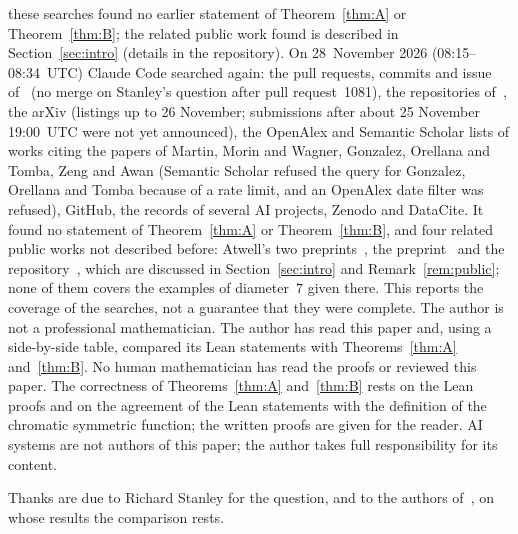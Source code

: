 \documentclass[11pt]{article}
\theoremstyle{definition}
\theoremstyle{remark}
\begin{document}
these searches found no earlier statement of Theorem~\ref{thm:A} or
Theorem~\ref{thm:B}; the related public work found is described in
Section~\ref{sec:intro} (details in the repository).
On 28~November 2026 (08:15--08:34~UTC) Claude Code searched again: the pull
requests, commits and issue of~\cite{sc} (no merge on Stanley's question after
pull request~1081), the repositories of~\cite{aur}, the arXiv (listings up to
26 November; submissions after about 25 November 19:00~UTC were not yet
announced), the OpenAlex and Semantic Scholar lists of works citing the papers of
Martin, Morin and Wagner, Gonzalez, Orellana and Tomba, Zeng and Awan (Semantic
Scholar refused the query for Gonzalez, Orellana and Tomba because of a rate
limit, and an OpenAlex date filter was refused), GitHub, the records of several
AI projects, Zenodo and DataCite. It found no statement of Theorem~\ref{thm:A}
or Theorem~\ref{thm:B}, and four related public works not described before: Atwell's two
preprints~\cite{atwell1,atwell2}, the preprint~\cite{carp} and the
repository~\cite{kyf}, which
are discussed in Section~\ref{sec:intro} and Remark~\ref{rem:public}; none of
them covers the examples of diameter~$7$ given there. This reports the coverage of the searches, not a guarantee
that they were complete. The author is not a professional mathematician.
The author has read this paper and, using a side-by-side table, compared its Lean statements with Theorems~\ref{thm:A} and~\ref{thm:B}. No human mathematician has read the proofs or reviewed this paper.
The correctness of Theorems~\ref{thm:A} and~\ref{thm:B} rests on the Lean proofs
and on the agreement of the Lean statements with the definition of the chromatic
symmetric function; the written proofs are given for the reader. AI systems are
not authors of this paper; the author takes full responsibility for its content.

\medskip
\noindent Thanks are due to Richard Stanley for the question, and to the authors
of~\cite{got,apdmoz,ot,zeng,awan,mmw,hj}, on whose results the comparison rests.
\end{document}
